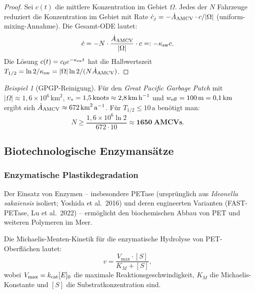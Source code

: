 ﻿\documentclass[12pt,a4paper]{article}
\theoremstyle{definition}
\theoremstyle{remark}
\newtheorem{beispiel}{Beispiel}[section]
\newcommand{\GPGP}{\textit{Great Pacific Garbage Patch}}
\begin{document}
\begin{proof}
Sei $c(t)$ die mittlere Konzentration im Gebiet $\Omega$. Jedes der $N$
Fahrzeuge reduziert die Konzentration im Gebiet mit Rate
$\dot{c}_j = -\dot{A}_{\rm AMCV} \cdot c / |\Omega|$ (uniform-mixing-Annahme).
Die Gesamt-ODE lautet:
\begin{equation}
  \dot{c} = -N \cdot \frac{\dot{A}_{\rm AMCV}}{|\Omega|} \cdot c =: -\kappa_{\rm sw} c.
\end{equation}
Die L\"osung $c(t) = c_0 e^{-\kappa_{\rm sw} t}$ hat die Halbwertszeit
$T_{1/2} = \ln 2 / \kappa_{\rm sw} = |\Omega| \ln 2 / (N \dot{A}_{\rm AMCV})$.
\end{proof}

\begin{beispiel}[GPGP-Reinigung]
F\"ur den \GPGP{} mit $|\Omega| \approx 1{,}6 \times 10^6\,\text{km}^2$,
$v_s = 1{,}5\,\text{knots} \approx 2{,}8\,\text{km\,h}^{-1}$ und
$w_{\rm eff} = 100\,\text{m} = 0{,}1\,\text{km}$ ergibt sich
$\dot{A}_{\rm AMCV} \approx 672\,\text{km}^2\,\text{a}^{-1}$.
F\"ur $T_{1/2} \leq 10\,\text{a}$ ben\"otigt man:
\begin{equation}
  N \geq \frac{1{,}6 \times 10^6 \ln 2}{672 \cdot 10} \approx \mathbf{1650\;\text{AMCVs}}.
\end{equation}
\end{beispiel}

\subsection{Biotechnologische Enzymans\"atze}

\subsubsection{Enzymatische Plastikdegradation}

Der Einsatz von Enzymen -- insbesondere PETase (urspr\"unglich aus
\textit{Ideonella sakaiensis} isoliert; Yoshida et al.\ 2016) und deren
engineerten Varianten (FAST-PETase, Lu et al.\ 2022) -- erm\"oglicht den
biochemischen Abbau von PET und weiteren Polymeren im Meer.

Die Michaelis-Menten-Kinetik f\"ur die enzymatische Hydrolyse von
PET-Oberfl\"achen lautet:
\begin{equation}
  v = \frac{V_{\max} \cdot [S]}{K_M + [S]},
  \label{eq:michaelis}
\end{equation}
wobei $V_{\max} = k_{\rm cat} [E]_0$ die maximale Reaktionsgeschwindigkeit,
$K_M$ die Michaelis-Konstante und $[S]$ die Substratkonzentration sind.
\end{document}
